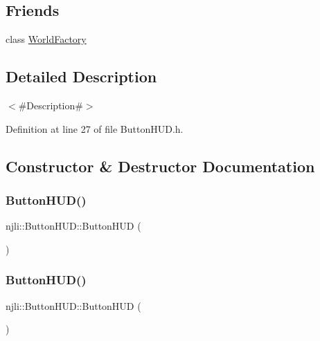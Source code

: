 \subsection*{Friends}
\begin{DoxyCompactItemize}
\item 
class \mbox{\hyperlink{classnjli_1_1_button_h_u_d_acb96ebb09abe8f2a37a915a842babfac}{World\+Factory}}
\end{DoxyCompactItemize}


\subsection{Detailed Description}
$<$\#\+Description\#$>$ 

Definition at line 27 of file Button\+H\+U\+D.\+h.



\subsection{Constructor \& Destructor Documentation}
\mbox{\label{classnjli_1_1_button_h_u_d_a506d6b5e9296d605dbb84a8a1f8866ef}} 
\subsubsection{\texorpdfstring{Button\+H\+U\+D()}{ButtonHUD()}\hspace{0.1cm}{\footnotesize\ttfamily [1/3]}}
{\footnotesize\ttfamily njli\+::\+Button\+H\+U\+D\+::\+Button\+H\+UD (\begin{DoxyParamCaption}{ }\end{DoxyParamCaption})\hspace{0.3cm}{\ttfamily [protected]}}

\mbox{\label{classnjli_1_1_button_h_u_d_a2bb41974899ae34203aaca05acb3fefb}} 
\subsubsection{\texorpdfstring{Button\+H\+U\+D()}{ButtonHUD()}\hspace{0.1cm}{\footnotesize\ttfamily [2/3]}}
{\footnotesize\ttfamily njli\+::\+Button\+H\+U\+D\+::\+Button\+H\+UD (\begin{DoxyParamCaption}\item[{const \mbox{\hyperlink{classnjli_1_1_abstract_builder}{Abstract\+Builder}} \&}]{ }\end{DoxyParamCaption})\hspace{0.3cm}{\ttfamily [protected]}}

